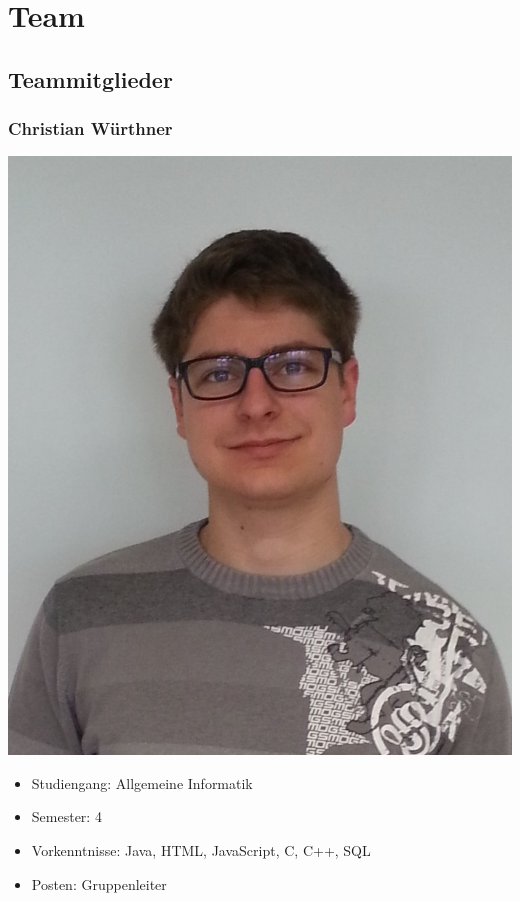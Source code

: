 \chapter{Team}

\section{Teammitglieder}

\subsection{Christian Würthner}

\begin{minipage}{0.28\textwidth} 
\includegraphics[width=\textwidth]{content/pictures/Gruppenbilder/Chris.jpg}
\end{minipage}%
\begin{minipage}{0.7\textwidth}
\begin{itemize}
  \item Studiengang: Allgemeine Informatik
  \item Semester: 4
  \item Vorkenntnisse: Java, HTML, JavaScript, C, C++, SQL
  \item Posten: Gruppenleiter
\end{itemize}
\end{minipage}

